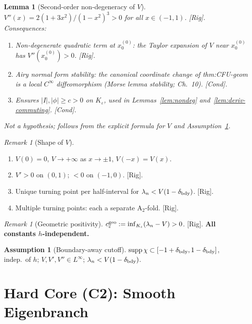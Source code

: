 \documentclass[12pt,a4paper]{amsart}
\newtheorem{lemma}[theorem]{Lemma}
\theoremstyle{definition}
\newtheorem{assumption}[theorem]{Assumption}
\theoremstyle{remark}
\newtheorem{remark}[theorem]{Remark}
\newcommand{\Rig}{\textup{[Rig]}}
\newcommand{\Cond}{\textup{[Cond]}}
\begin{document}
\begin{lemma}[Second-order non-degeneracy of $V$]
\label{lem:vpp}
$V''(x)=2(1+3x^2)/(1-x^2)^3>0$ for all $x\in(-1,1)$. \Rig.
Consequences:
\begin{enumerate}[{\rm(i)}]
\item Non-degenerate quadratic term at $x_0^{(0)}$:
  the Taylor expansion of $V$ near $x_0^{(0)}$ has
  $V''(x_0^{(0)})>0$. \Rig.
\item Airy normal form stability: the canonical coordinate change
  of thm:CFU-geom is a local $C^\infty$ diffeomorphism
  (Morse lemma stability; \cite{Olver1974} Ch.~10). \Cond.
\item Ensures $|I|,|\phi|\ge c>0$ on $K_\varepsilon$,
  used in Lemmas~\ref{lem:nondeg} and~\ref{lem:deriv-commuting}. \Cond.
\end{enumerate}
\emph{Not a hypothesis; follows from the explicit formula for $V$
and Assumption~\ref{ass:boundary-away}.}
\end{lemma}

\begin{remark}[Shape of $V$]
\label{rem:V-shape}
\begin{enumerate}[{\rm(i)}]
\item $V(0)=0$, $V\to+\infty$ as $x\to\pm 1$, $V(-x)=V(x)$.
\item $V'>0$ on $(0,1)$; $<0$ on $(-1,0)$. \Rig.
\item Unique turning point per half-interval
  for $\lambda_n<V(1-\delta_{\rm bdy})$. \Rig.
\item Multiple turning points: each a separate A$_2$-fold. \Rig.
\end{enumerate}
\end{remark}

\begin{remark}[Geometric positivity]
\label{rem:geo-positivity}
$c_\varepsilon^{\rm geo}:=\inf_{K_\varepsilon}(\lambda_n-V)>0$. \Rig.
\textbf{All constants $h$-independent.}
\end{remark}

\begin{assumption}[Boundary-away cutoff]
\label{ass:boundary-away}
$\mathrm{supp}\,\chi\subset[-1+\delta_{\rm bdy},1-\delta_{\rm bdy}]$,
indep.\ of $h$; $V,V',V''\in L^\infty$;
$\lambda_n<V(1-\delta_{\rm bdy})$.
\end{assumption}

\section{Hard Core (C2): Smooth Eigenbranch}
\label{sec:eigenbranch}
\end{document}

